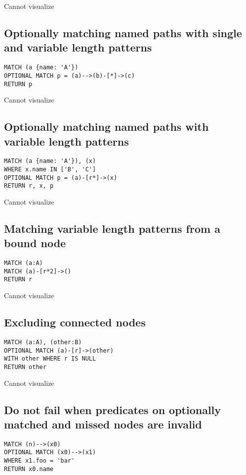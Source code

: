 Cannot visualize
\subsection{Optionally matching named paths with single and variable length patterns}

\begin{lstlisting}
MATCH (a {name: 'A'})
OPTIONAL MATCH p = (a)-->(b)-[*]->(c)
RETURN p
\end{lstlisting}

Cannot visualize
\subsection{Optionally matching named paths with variable length patterns}

\begin{lstlisting}
MATCH (a {name: 'A'}), (x)
WHERE x.name IN ['B', 'C']
OPTIONAL MATCH p = (a)-[r*]->(x)
RETURN r, x, p
\end{lstlisting}

Cannot visualize
\subsection{Matching variable length patterns from a bound node}

\begin{lstlisting}
MATCH (a:A)
MATCH (a)-[r*2]->()
RETURN r
\end{lstlisting}

Cannot visualize
\subsection{Excluding connected nodes}

\begin{lstlisting}
MATCH (a:A), (other:B)
OPTIONAL MATCH (a)-[r]->(other)
WITH other WHERE r IS NULL
RETURN other
\end{lstlisting}

Cannot visualize
\subsection{Do not fail when predicates on optionally matched and missed nodes are invalid}

\begin{lstlisting}
MATCH (n)-->(x0)
OPTIONAL MATCH (x0)-->(x1)
WHERE x1.foo = 'bar'
RETURN x0.name
\end{lstlisting}


